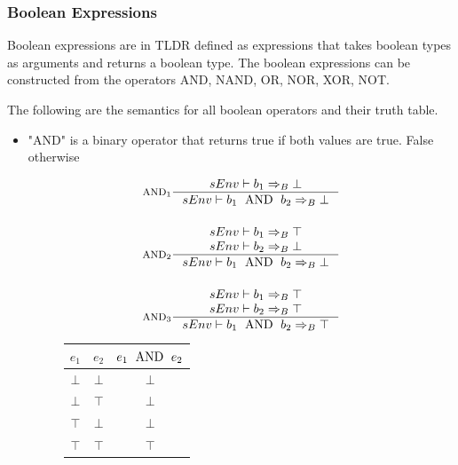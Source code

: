 \subsubsection{Boolean Expressions}
Boolean expressions are in TLDR defined as expressions that takes boolean types as arguments and returns a boolean type. The boolean expressions can be constructed from the operators AND, NAND, OR, NOR, XOR, NOT.

The following are the semantics for all boolean operators and their truth table.

\begin{itemize}
\item "AND" is a binary operator that returns true if both values are true. False otherwise
\begin{figure}[H]
\centering
  \begin{minipage}[c]{0.45\linewidth}
	  \centering
    \begin{align*}
    &\inference[$\text{AND}_1$]{sEnv \vdash b_1 \Rightarrow_B \bot}
                               {sEnv \vdash b_1 \Tand b_2 \Rightarrow_B \bot}
    \\\\
    &\inference[$\text{AND}_2$]{sEnv \vdash b_1 \Rightarrow_B \top \\ sEnv \vdash b_2 \Rightarrow_B \bot}
                               {sEnv \vdash b_1 \Tand b_2 \Rightarrow_B \bot}
    \\\\
    &\inference[$\text{AND}_3$]{sEnv \vdash b_1 \Rightarrow_B \top \\ sEnv \vdash b_2 \Rightarrow_B \top}
                               {sEnv \vdash b_1 \Tand b_2 \Rightarrow_B \top}
    \end{align*}
  \end{minipage}
	\quad
	\begin{minipage}[c]{0.45\linewidth}
	  \centering
    \begin{tabular}{ | c | c | c | }
      \hline
      $e_1$ & $e_2$ & $e_1 \text{\; AND \;} e_2$ \\\hline
      $\bot$ & $\bot$ & $\bot$ \\\hline
      $\bot$ & $\top$ & $\bot$ \\\hline
      $\top$ & $\bot$ & $\bot$ \\\hline
      $\top$ & $\top$ & $\top$ \\\hline
    \end{tabular}
  \end{minipage}
\end{figure}


\end{itemize}
